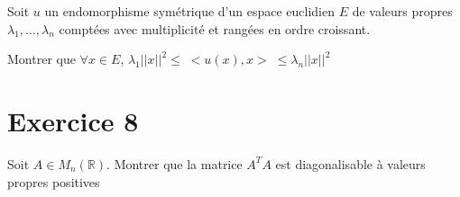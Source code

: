 \documentclass[11pt]{article}
\begin{document}
Soit $u$ un endomorphisme symétrique d'un espace euclidien $E$ de valeurs propres $\lambda_1,\dots,\lambda_n$ comptées avec multiplicité et rangées en ordre croissant.

Montrer que $ \forall x\in E$, $\lambda_1||x||^2\leqslant \; <u(x),x>\;\leqslant  \lambda_n ||x||^2$  

\section*{Exercice 8}

Soit $A\in \textit{M}_n(\mathbb{R}
)$. Montrer que la matrice $A^{T}A$ est diagonalisable à valeurs propres positives
\end{document}
